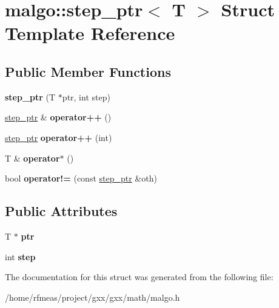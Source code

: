 \hypertarget{structmalgo_1_1step__ptr}{}\section{malgo\+:\+:step\+\_\+ptr$<$ T $>$ Struct Template Reference}
\label{structmalgo_1_1step__ptr}
\subsection*{Public Member Functions}
\begin{DoxyCompactItemize}
\item 
{\bfseries step\+\_\+ptr} (T $\ast$ptr, int step)\hypertarget{structmalgo_1_1step__ptr_a4f38d35a876208597a3c43fbda016c51}{}\label{structmalgo_1_1step__ptr_a4f38d35a876208597a3c43fbda016c51}

\item 
\hyperlink{structmalgo_1_1step__ptr}{step\+\_\+ptr} \& {\bfseries operator++} ()\hypertarget{structmalgo_1_1step__ptr_a371a4e406605f80b5664401b27d6c72f}{}\label{structmalgo_1_1step__ptr_a371a4e406605f80b5664401b27d6c72f}

\item 
\hyperlink{structmalgo_1_1step__ptr}{step\+\_\+ptr} {\bfseries operator++} (int)\hypertarget{structmalgo_1_1step__ptr_aa9e2a9056b972e8435a7c4cf6a8def43}{}\label{structmalgo_1_1step__ptr_aa9e2a9056b972e8435a7c4cf6a8def43}

\item 
T \& {\bfseries operator$\ast$} ()\hypertarget{structmalgo_1_1step__ptr_aeb4ef7253a814dcd683fd8ca350304c8}{}\label{structmalgo_1_1step__ptr_aeb4ef7253a814dcd683fd8ca350304c8}

\item 
bool {\bfseries operator!=} (const \hyperlink{structmalgo_1_1step__ptr}{step\+\_\+ptr} \&oth)\hypertarget{structmalgo_1_1step__ptr_ac97c3542f3101008e56ee44d5f5813aa}{}\label{structmalgo_1_1step__ptr_ac97c3542f3101008e56ee44d5f5813aa}

\end{DoxyCompactItemize}
\subsection*{Public Attributes}
\begin{DoxyCompactItemize}
\item 
T $\ast$ {\bfseries ptr}\hypertarget{structmalgo_1_1step__ptr_a7e972c2ac3ba9de39cbfcc6a93e73c0e}{}\label{structmalgo_1_1step__ptr_a7e972c2ac3ba9de39cbfcc6a93e73c0e}

\item 
int {\bfseries step}\hypertarget{structmalgo_1_1step__ptr_a31fe83deb045e666549c58786a2ec085}{}\label{structmalgo_1_1step__ptr_a31fe83deb045e666549c58786a2ec085}

\end{DoxyCompactItemize}


The documentation for this struct was generated from the following file\+:\begin{DoxyCompactItemize}
\item 
/home/rfmeas/project/gxx/gxx/math/malgo.\+h\end{DoxyCompactItemize}
